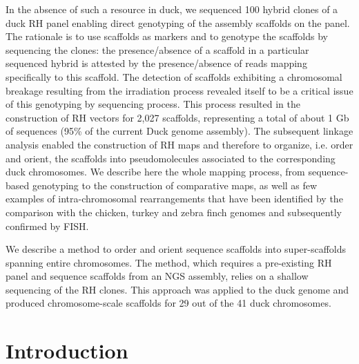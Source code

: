 \documentclass[10pt,letterpaper]{article}
\begin{document}
In the absence of such a resource in duck, we sequenced 100 hybrid clones of a duck RH panel enabling direct genotyping of the assembly scaffolds on the panel. 
The rationale is to use scaffolds as markers and to genotype the scaffolds by sequencing the clones: the presence/absence of a scaffold in a particular sequenced hybrid is attested by the presence/absence of reads mapping specifically to this scaffold. 
The detection of scaffolds exhibiting a chromosomal breakage resulting from the irradiation process revealed itself to be a critical issue of this genotyping by sequencing process. 
This process resulted in the construction of RH vectors for 2,027 scaffolds, representing a total of about 1 Gb of sequences (95\% of the current Duck genome assembly). 
The subsequent linkage analysis enabled the construction of RH maps and therefore to organize, i.e. order and orient, the scaffolds into pseudomolecules associated to the corresponding duck chromosomes. 
We describe here the whole mapping process, from sequence-based genotyping to the construction of comparative maps, as well as few examples of intra-chromosomal rearrangements that have been identified by the comparison with the chicken, turkey and zebra finch genomes and subsequently confirmed by FISH.

We describe a method to order and orient sequence scaffolds into super-scaffolds spanning entire chromosomes. 
The method, which requires a pre-existing RH panel and sequence scaffolds from an NGS assembly, relies on a shallow sequencing of the RH clones. This approach was applied to the duck genome and produced chromosome-scale scaffolds for 29 out of the 41 duck chromosomes.

\nolinenumbers

\section*{Introduction}
\end{document}
